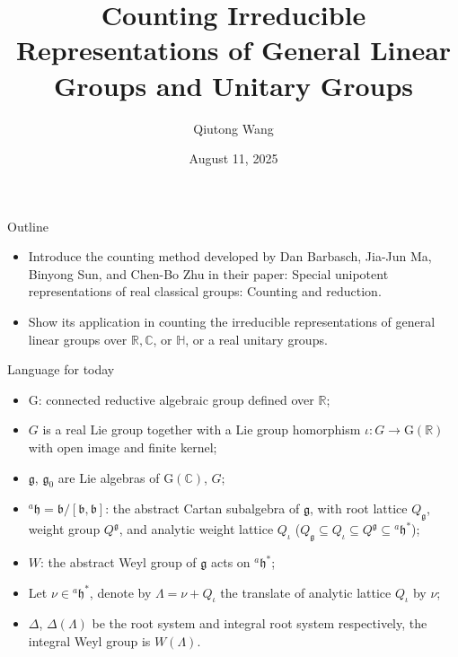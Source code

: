 \documentclass[fleqn,xcolor=dvipsnames]{beamer}
\title[]{Counting Irreducible Representations of General Linear Groups and Unitary Groups}
\author{Qiutong Wang}
\institute{Zhejiang University}
\date{August 11, 2025}
\newcommand{\BC}{{\mathbb {C}}}
\newcommand{\BH}{{\mathbb {H}}}
\newcommand{\BR}{{\mathbb {R}}}
\newcommand{\RG}{{\mathrm {G}}}
\newcommand{\fb}{\mathfrak{b}}
\newcommand{\fg}{\mathfrak{g}}
\newcommand{\fh}{\mathfrak{h}}
\begin{document}
\begin{frame}
  \titlepage
\end{frame}




\begin{frame}{Outline}

\begin{itemize}
  \item Introduce the counting method developed by Dan Barbasch, Jia-Jun Ma, Binyong Sun, and Chen-Bo Zhu in their paper: Special unipotent representations of real classical groups: Counting and reduction.
  \pause \item Show its application in counting the irreducible representations of general linear groups over $\BR, \BC$, or $\BH$, or a real unitary groups.
\end{itemize}
\end{frame}












\begin{frame}{Language for today}
  \begin{itemize}
    \item $\RG$: connected reductive algebraic group defined over $\BR$;
    \pause\item $G$ is a real Lie group together with a Lie group homorphism $\iota: G \to \RG(\BR)$ with open image and finite kernel;
    \pause\item $\fg$, $\fg_0$ are Lie algebras of $\RG(\BC)$, $G$;
    \pause\item $^{a}\fh = \fb/[\fb,\fb]$: the abstract Cartan subalgebra of $\fg$, with root lattice $Q_{\fg}$, weight group $Q^{\fg}$, and analytic weight lattice $Q_{\iota}$ ($Q_{\fg} \subseteq Q_{\iota} \subseteq Q^{\fg} \subseteq {^{a}\fh}^*$);
    \pause\item $W$: the abstract Weyl group of $\fg$ acts on $^{a}\fh^*$;
    \pause\item Let $\nu \in {^{a}\fh}^*$, denote by $\Lambda = \nu + Q_{\iota}$ the translate of analytic lattice $Q_{\iota}$ by $\nu$;
    \pause\item $\Delta$, $\Delta(\Lambda)$ be the root system and integral root system respectively, the integral Weyl group is $W(\Lambda)$.
  \end{itemize}
\end{frame}
\end{document}
